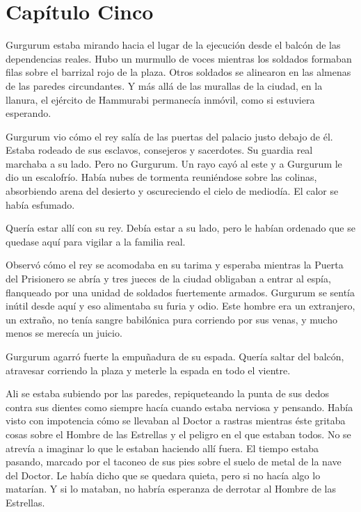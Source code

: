 \chapter*{Capítulo Cinco}


Gurgurum estaba mirando hacia el lugar de la ejecución desde el balcón
de las dependencias reales. Hubo un murmullo de voces mientras los
soldados formaban filas sobre el barrizal rojo de la plaza. Otros
soldados se alinearon en las almenas de las paredes circundantes. Y más
allá de las murallas de la ciudad, en la llanura, el ejército de
Hammurabi permanecía inmóvil, como si estuviera esperando.

Gurgurum vio cómo el rey salía de las puertas del palacio justo debajo
de él. Estaba rodeado de sus esclavos, consejeros y sacerdotes. Su
guardia real marchaba a su lado. Pero no Gurgurum. Un rayo cayó al este
y a Gurgurum le dio un escalofrío. Había nubes de tormenta reuniéndose
sobre las colinas, absorbiendo arena del desierto y oscureciendo el
cielo de mediodía. El calor se había esfumado.

Quería estar allí con su rey. Debía estar a su lado, pero le habían
ordenado que se quedase aquí para vigilar a la familia real.

Observó cómo el rey se acomodaba en su tarima y esperaba mientras la
Puerta del Prisionero se abría y tres jueces de la ciudad obligaban a
entrar al espía, flanqueado por una unidad de soldados fuertemente
armados. Gurgurum se sentía inútil desde aquí y eso alimentaba su furia
y odio. Este hombre era un extranjero, un extraño, no tenía sangre
babilónica pura corriendo por sus venas, y mucho menos se merecía un
juicio.

Gurgurum agarró fuerte la empuñadura de su espada. Quería saltar del
balcón, atravesar corriendo la plaza y meterle la espada en todo el
vientre.

Ali se estaba subiendo por las paredes, repiqueteando la punta de sus
dedos contra sus dientes como siempre hacía cuando estaba nerviosa y
pensando. Había visto con impotencia cómo se llevaban al Doctor a
rastras mientras éste gritaba cosas sobre el Hombre de las Estrellas y
el peligro en el que estaban todos. No se atrevía a imaginar lo que le
estaban haciendo allí fuera. El tiempo estaba pasando, marcado por el
taconeo de sus pies sobre el suelo de metal de la nave del Doctor. Le
había dicho que se quedara quieta, pero si no hacía algo lo matarían. Y
si lo mataban, no habría esperanza de derrotar al Hombre de las
Estrellas.

